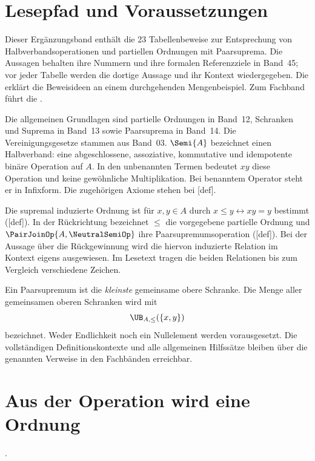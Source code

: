 \section*{Lesepfad und Voraussetzungen}
Dieser Ergänzungsband enthält die 23 Tabellenbeweise zur Entsprechung von
Halbverbandsoperationen und partiellen Ordnungen mit Paarsuprema.
Die Aussagen behalten ihre Nummern und ihre formalen Referenzziele in Band~45;
vor jeder Tabelle werden die dortige Aussage und ihr Kontext wiedergegeben.
Die \SemilatticeReadingLink{} erklärt die Beweisideen an einem durchgehenden
Mengenbeispiel. Zum Fachband führt die \SemilatticeMainLink{}.

Die allgemeinen Grundlagen sind partielle Ordnungen in Band~12,
Schranken und Suprema in Band~13 sowie Paarsuprema in Band~14.
Die Vereinigungsgesetze stammen aus Band~03.
\(\Semi{A}\) bezeichnet einen Halbverband: eine abgeschlossene,
assoziative, kommutative und idempotente binäre Operation auf \(A\).
In den unbenannten Termen bedeutet \(xy\) diese Operation und keine
gewöhnliche Multiplikation. Bei benanntem Operator steht er in Infixform.
Die zugehörigen Axiome stehen bei [def].

Die supremal induzierte Ordnung ist für \(x,y\in A\) durch
\(x\leq y\leftrightarrow xy=y\) bestimmt
([def]). In der Rückrichtung bezeichnet
\(\leq\) die vorgegebene partielle Ordnung und
\(\PairJoinOp{A,\NeutralSemiOp}\) ihre Paarsupremumsoperation
([def]). Bei der Aussage über die
Rückgewinnung wird die hiervon induzierte Relation im Kontext eigens
ausgewiesen. Im Lesetext tragen die beiden Relationen bis zum Vergleich
verschiedene Zeichen.

Ein Paarsupremum ist die \emph{kleinste} gemeinsame obere Schranke.
Die Menge aller gemeinsamen oberen Schranken wird mit
\[
  \UB_{A,\leq}(\{x,y\})
\]
bezeichnet.
Weder Endlichkeit noch ein Nullelement werden vorausgesetzt.
Die vollständigen Definitionskontexte und alle allgemeinen Hilfssätze
bleiben über die genannten Verweise in den Fachbänden erreichbar.

\par{}
\section*{Aus der Operation wird eine Ordnung}
\noindent{}.\par

